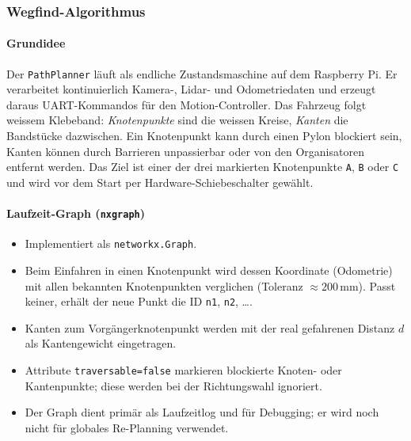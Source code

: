 \documentclass[main.tex]{subfiles} %
\begin{document}
\subsubsection{Wegfind-Algorithmus}

\paragraph{Grundidee}
Der \texttt{PathPlanner} läuft als endliche Zustandsmaschine auf dem
Raspberry Pi.
Er verarbeitet kontinuierlich Kamera-, Lidar- und Odometriedaten und erzeugt
daraus UART-Kommandos für den Motion-Controller.
Das Fahrzeug folgt weissem Klebeband:
\emph{Knotenpunkte} sind die weissen Kreise,
\emph{Kanten} die Bandstücke dazwischen.
Ein Knotenpunkt kann durch einen Pylon blockiert sein,
Kanten können durch Barrieren unpassierbar oder von den Organisatoren entfernt
werden.
Das Ziel ist einer der drei markierten Knotenpunkte \texttt{A}, \texttt{B} oder
\texttt{C} und wird vor dem Start per Hardware-Schiebeschalter gewählt.

\paragraph{Laufzeit-Graph (\texttt{nxgraph})}
\vspace{-0.3\baselineskip}
\begin{itemize}
  \item Implementiert als \texttt{networkx.Graph}.
  \item Beim Einfahren in einen Knotenpunkt wird dessen Koordinate (Odometrie)
    mit allen bekannten Knotenpunkten verglichen
    (Toleranz $\approx200\,\mathrm{mm}$).
    Passt keiner, erhält der neue Punkt die ID \texttt{n1}, \texttt{n2}, ….
  \item Kanten zum Vorgängerknotenpunkt werden mit der real gefahrenen Distanz
    $d$ als Kantengewicht eingetragen.
  \item Attribute \texttt{traversable=false} markieren blockierte Knoten-
    oder Kantenpunkte; diese werden bei der Richtungswahl ignoriert.
  \item Der Graph dient primär als Laufzeitlog und für Debugging;
    er wird noch nicht für globales Re-Planning verwendet.
\end{itemize}
\end{document}
